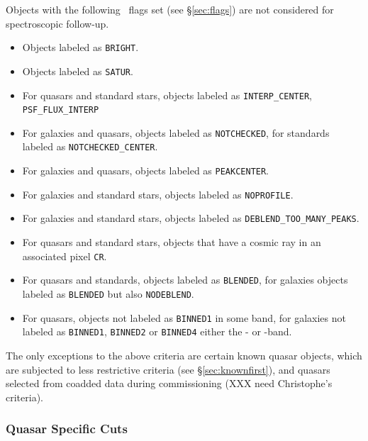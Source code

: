 \documentclass[12pt,preprint]{aastex}
\begin{document}
Objects with the following \objflags\ flags set (see \S \ref{sec:flags}) are
not considered for spectroscopic follow-up.  

\begin{itemize}

    \item Objects labeled as \texttt{BRIGHT}.
    \item Objects labeled as \texttt{SATUR}.

    \item For quasars and standard stars, objects
        labeled as \texttt{INTERP\_CENTER}, 
        \texttt{PSF\_FLUX\_INTERP}

    \item For galaxies and quasars, objects labeled
        as \texttt{NOTCHECKED}, for standards labeled
        as \texttt{NOTCHECKED\_CENTER}.

    \item For galaxies and quasars, objects labeled as
        \texttt{PEAKCENTER}.

    \item For galaxies and standard stars, objects labeled
        as \texttt{NOPROFILE}.

    \item For galaxies and standard stars, objects labeled as 
        \texttt{DEBLEND\_TOO\_MANY\_PEAKS}.

    \item For quasars and standard stars, objects that have
        a cosmic ray in an associated pixel \texttt{CR}.
    
    \item For quasars and standards, objects labeled
        as \texttt{BLENDED}, for galaxies objects labeled
        as \texttt{BLENDED} but also \texttt{NODEBLEND}.


    \item For quasars, objects not labeled as \texttt{BINNED1} in some band, 
    for galaxies not labeled as \texttt{BINNED1}, \texttt{BINNED2}
    or \texttt{BINNED4} either the \rmag- or \imag-band.
   
\end{itemize}

The only exceptions to the above criteria are certain known quasar objects,
which are subjected to less restrictive criteria (see \S \ref{sec:knownfirst}),
and quasars selected from coadded data during commissioning (XXX need
Christophe's criteria).

\subsubsection{Quasar Specific Cuts} \label{sec:cutqso}
\end{document}

